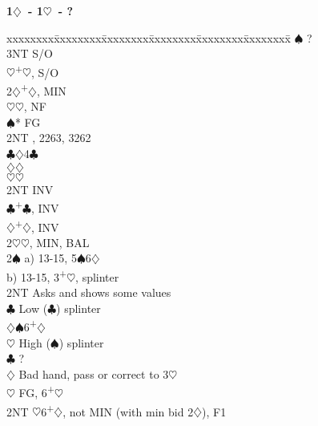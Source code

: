 \documentclass[10pt]{article}
\renewcommand{\c}{$\clubsuit$}
\renewcommand{\d}{$\diamondsuit$}
\newcommand{\h}{$\heartsuit$}
\newcommand{\s}{$\spadesuit$}
\newcommand{\p}{\textsuperscript{+}}
\newenvironment{bidtable}[1][]
{\textbf{#1}
  \begin{adjustwidth}{1em}{}
    \addvspace{2pt}
    \begin{tabbing}
      xxxxxxxx\=xxxxxxxx\=xxxxxxxx\=xxxxxxxx\=xxxxxxxx\=xxxxxxxx\=\kill}
{\end{tabbing}\end{adjustwidth}\bigskip}%
\begin{document}
\begin{multicols*}{2}
\begin{bidtable}[1\d\ - 1\h\ - ?]
                \s  \> ?                                       \\
                \> 3NT  \> S/O                                     \\
                \h  {}\p\h, S/O                              \\
2\d             {}\p\d, MIN                                      \\
                \h  {}\h, NF                                 \\
                \s* \> FG                                      \\
                \>      \> 2NT      , 2263, 3262            \\
                \>      \c      {}\d 4\c                     \\
                \>      \d      {}\d                         \\
                \>      \h      {}\h                         \\
                \> 2NT  \> INV                                     \\
                \c  {}\p\c, INV                              \\
                \d  {}\p\d, INV                              \\
2\h             {}\h, MIN, BAL                                   \\
2\s             \> a) 13-15, 5\s 6\d                               \\
                \> b) 13-15, 3\p\h, splinter                       \\
                \> 2NT  \> Asks and shows some values              \\
                \>      \c      \> Low (\c) splinter           \\
                \>      \d      {}\s 6\p\d                   \\
                \>      \h      \> High (\s) splinter          \\
                \c  \> ?                                       \\
                \d  \> Bad hand, pass or correct to 3\h        \\
                \h  \> FG, 6\p\h                               \\
2NT             \h 6\p\d, not MIN (with min bid 2\d), F1       \\

\end{bidtable}
\end{multicols*}
\end{document}
